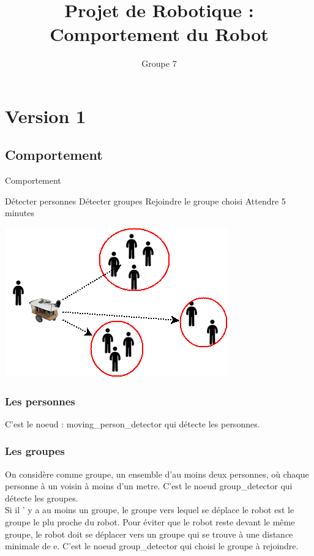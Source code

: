 \documentclass{report}
\title{Projet de Robotique : Comportement du Robot}
\author{Groupe 7}
\begin{document}
\maketitle

\chapter{Version 1}

\section{Comportement}
\begin{algorithm}
\caption{Comportement}
\begin{algorithmic}
\STATE D\'etecter personnes
\STATE D\'etecter groupes
\STATE Rejoindre le groupe choisi
\STATE Attendre 5 minutes
\ENDWHILE
\end{algorithmic}
\end{algorithm}

\begin{center}
\includegraphics[scale=0.6]{action_v1.png}
\end{center}

\subsection{Les personnes}

C'est le noeud : moving\_person\_detector qui d\'etecte les personnes.

\subsection{Les groupes}

On consid\`ere comme groupe, un ensemble d'au moins deux personnes, o\`u chaque
personne \`a un voisin \`a moins d'un metre. C'est le noeud group\_detector qui
d\'etecte les groupes.\\
Si il ' y a au moins un groupe, le groupe vers lequel se d\'eplace le robot est
le groupe le plu proche du robot. Pour \'eviter que le robot reste devant le
m\^eme groupe, le robot doit se d\'eplacer vers un groupe qui se trouve \`a une
distance minimale de e. C'est le noeud group\_detector qui choisi le
groupe \`a rejoindre.
\end{document}
